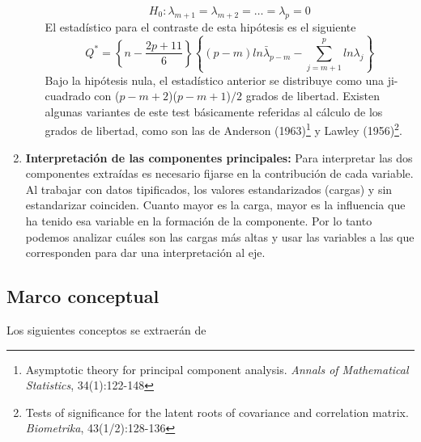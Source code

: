 \begin{enumerate}
\begin{enumerate}
        \begin{equation}
            H_0:\lambda_{m+1}=\lambda_{m+2}=\ldots=\lambda_p=0
        \end{equation}
        El estadístico para el contraste de esta hipótesis es el siguiente
        \begin{equation}
            Q^*=\left\{n-\frac{2p+11}{6} \right\}\left\{(p-m)ln\bar{\lambda}_{p-m}-\sum\limits_{j = m+1}^{p}ln\lambda_j \right\}
        \end{equation}
        Bajo la hipótesis nula, el estadístico anterior se distribuye como una ji-cuadrado con ($p-m+2$)($p-m+1$)$/2$ grados de libertad. Existen algunas variantes de este test básicamente referidas al cálculo de los grados de libertad, como son las de Anderson (1963)\footnote{Asymptotic theory for principal component analysis. \textsl{Annals of Mathematical Statistics}, 34(1):122-148} y Lawley (1956)\footnote{Tests of significance for the latent roots of covariance and correlation matrix. \textsl{Biometrika}, 43(1/2):128-136}.
    \end{enumerate}
    \item \textbf{Interpretación de las componentes principales:} Para interpretar las dos componentes extraídas es necesario fijarse en la contribución de cada variable. Al trabajar con datos tipificados, los valores estandarizados (cargas) y sin estandarizar coinciden. Cuanto mayor es la carga, mayor es la influencia que ha tenido esa variable en la formación de la componente. Por lo tanto podemos analizar cuáles son las cargas más altas y usar las variables a las que corresponden para dar una interpretación al eje.
\end{enumerate}



\subsection{Marco conceptual}

Los siguientes conceptos se extraerán de \citep{sanchez2012cirugia}

